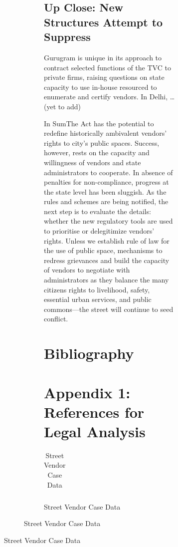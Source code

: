 \documentclass[a4paper, 12pt, twoside]{article}
\begin{document}
\begin{figure}
{\begin{figure}
\begin{figure}
\subsection*{Up Close: New Structures Attempt to Suppress}


Gurugram is unique in its approach to contract selected functions of the TVC to private firms, raising questions on state capacity to use in-house resourced to enumerate and certify vendors.
In Delhi, … (yet to add)

In SumThe Act has the potential to redefine historically ambivalent vendors’ rights to  city’s public spaces. Success, however, rests on the capacity and willingness of vendors and state administrators to cooperate. In absence of penalties for non-compliance, progress at the state level has been sluggish. As the rules and schemes are being notified, the next step is to evaluate the details: whether the new regulatory tools are used to prioritise or delegitimize vendors’ rights. Unless we establish rule of law for the use of public space, mechanisms to redress grievances and build the capacity of vendors to negotiate with administrators as they balance the many citizens rights to livelihood, safety, essential urban services, and public commons—the street will continue to seed conflict.


\newpage
\section*{Bibliography}

\section*{Appendix 1: References for Legal Analysis}
\label{sec: Appendix 1}
            \scriptsize
            \begin{longtable}{>{\raggedright}p{1.5cm}>{\raggedright}p{2.5cm}>{\raggedright}p{1.3cm}>{\raggedright}p{1.5cm}>{\raggedright}p{1.1cm}>{\raggedright}p{1.2cm}>{\raggedright}p{1cm}>{\raggedright}p{1.8cm}>{\raggedright}p{1.3cm}>{\raggedright}p{4.45cm}>{\raggedright\arraybackslash}p{1.2cm}}

            \caption{Street Vendor Case Data}\\


\end{longtable}
\end{figure}
\end{figure}}
\end{figure}
\end{document}
